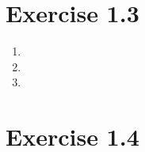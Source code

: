 \documentclass{article}
\begin{document}
\section*{Exercise 1.3}
\begin{enumerate}[label=(\alph*)]
	\item
	\item
	\item
\end{enumerate}

\section*{Exercise 1.4}
\end{document}
